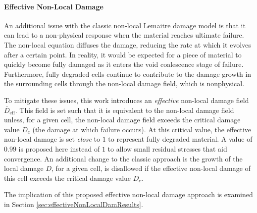 \documentclass[sn-mathphys,Numbered]{sn-jnl}%
\begin{document}



\paragraph{Effective Non-Local Damage} \label{sec:effNonLocalDam}
An additional issue with the classic non-local Lemaitre damage model is that it can lead to a non-physical response when the material reaches ultimate failure.
The non-local equation diffuses the damage, reducing the rate at which it evolves after a certain point.
In reality, it would be expected for a piece of material to quickly become fully damaged as it enters the void coalescence stage of failure.
Furthermore, fully degraded cells continue to contribute to the damage growth in the surrounding cells through the non-local damage field, which is nonphysical.

To mitigate these issues, this work introduces an \emph{effective} non-local damage field $\bar{D}_{\text{eff}}$.
This field is set such that it is equivalent to the non-local damage field unless, for a given cell, the non-local damage field exceeds the critical damage value $D_c$ (the damage at which failure occurs).
At this critical value, the effective non-local damage is set \emph{close} to $1$ to represent fully degraded material.
A value of $0.99$ is proposed here instead of $1$ to allow small residual stresses that aid convergence.
An additional change to the classic approach is the growth of the local damage $D$, for a given cell, is disallowed if the effective non-local damage of this cell exceeds the critical damage value $D_c$.

The implication of this proposed effective non-local damage approach is examined in Section \ref{sec:effectiveNonLocalDamResults}.

\end{document}
